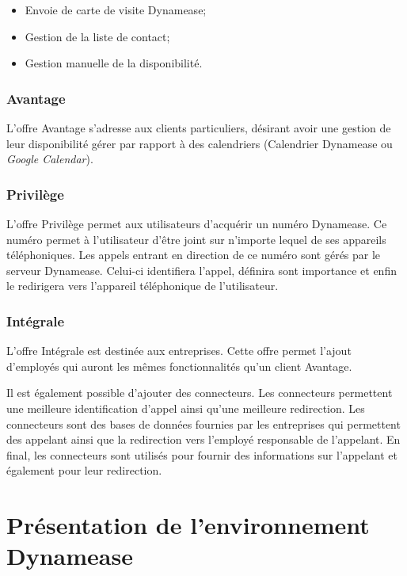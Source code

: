 \begin{itemize}
	\item Envoie de carte de visite Dynamease;
	\item Gestion de la liste de contact;
	\item Gestion manuelle de la disponibilité.
\end{itemize}

\subsubsection{Avantage}

L'offre Avantage s'adresse aux clients particuliers, désirant avoir une gestion de leur disponibilité gérer par rapport à des calendriers (Calendrier Dynamease ou \textit{Google Calendar}).

\subsubsection{Privilège}

L'offre Privilège permet aux utilisateurs d'acquérir un numéro Dynamease. Ce numéro permet à l'utilisateur d'être joint sur n'importe lequel de ses appareils téléphoniques. Les appels entrant en direction de ce numéro sont gérés par le serveur Dynamease. Celui-ci identifiera l'appel, définira sont importance et enfin le redirigera vers l'appareil téléphonique de l'utilisateur.

\subsubsection{Intégrale}

L'offre Intégrale est destinée aux entreprises. Cette offre permet l'ajout d'employés qui auront les mêmes fonctionnalités qu'un client  Avantage.

Il est également possible d'ajouter des connecteurs. Les connecteurs permettent une meilleure identification d'appel ainsi qu'une meilleure redirection. Les connecteurs sont des bases de données fournies par les entreprises qui permettent des appelant ainsi que la redirection vers l'employé responsable de l'appelant. En final, les connecteurs sont utilisés pour fournir des informations sur l'appelant et également pour leur redirection.

\section{Présentation de l'environnement Dynamease}

